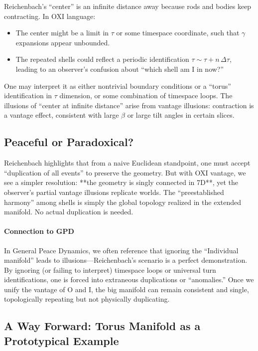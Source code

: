 \documentclass{article}
\begin{document}
Reichenbach’s “center” is an infinite distance away because rods and bodies keep contracting. In OXI language:
\begin{itemize}
  \item The center might be a limit in $\tau$ or some timespace coordinate, such that $\gamma$ expansions appear unbounded.
  \item The repeated shells could reflect a periodic identification $\tau \sim \tau + n\,\Delta\tau$, leading to an observer’s confusion about “which shell am I in now?”
\end{itemize}

One may interpret it as either nontrivial boundary conditions or a “torus” identification in $\tau$ dimension, or some combination of timespace loops. The illusions of “center at infinite distance” arise from vantage illusions: contraction is a vantage effect, consistent with large $\beta$ or large tilt angles in certain slices.

\subsection{Peaceful or Paradoxical?}

Reichenbach highlights that from a naive Euclidean standpoint, one must accept “duplication of all events” to preserve the geometry. But with OXI vantage, we see a simpler resolution: **the geometry is singly connected in 7D**, yet the observer’s partial vantage illusions replicate worlds. The “preestablished harmony” among shells is simply the global topology realized in the extended manifold. No actual duplication is needed.

\paragraph{Connection to GPD} In General Peace Dynamics, we often reference that ignoring the “Individual manifold” leads to illusions—Reichenbach’s scenario is a perfect demonstration. By ignoring (or failing to interpret) timespace loops or universal turn identifications, one is forced into extraneous duplications or “anomalies.” Once we unify the vantage of O and I, the big manifold can remain consistent and single, topologically repeating but not physically duplicating.

\subsection{A Way Forward: Torus Manifold as a Prototypical Example}
\end{document}
